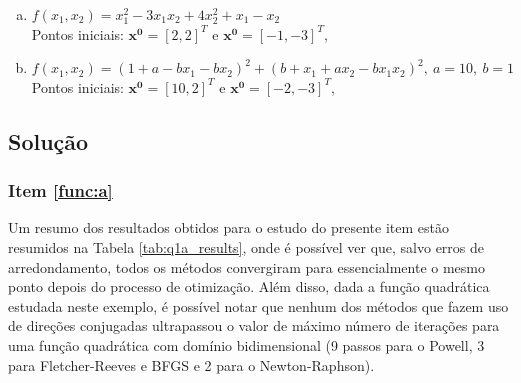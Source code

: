\documentclass[10pt, a4paper]{article}
\begin{document}
\begin{enumerate}[(a)]
  \item $f(x_1, x_2) = x_1^2 - 3x_1x_2 + 4x_2^2 + x_1 - x_2$ \\
        Pontos iniciais: $\mathbf{x^0} = [2, 2]^T$ e $\mathbf{x^0} = [-1, -3]^T$, \label{func:a}
  \item $f(x_1, x_2) = (1 + a - bx_1 - bx_2)^2 + (b + x_1 + ax_2 - bx_1x_2)^2, \ a = 10, \ b = 1$ \\
        Pontos iniciais: $\mathbf{x^0} = [10, 2]^T$ e $\mathbf{x^0} = [-2, -3]^T$, \label{func:b}
\end{enumerate}

\subsection{Solução}

\subsubsection{Item \ref{func:a}}

Um resumo dos resultados obtidos para o estudo do presente item estão resumidos na Tabela \ref{tab:q1a_results}, onde é
possível ver que, salvo erros de arredondamento, todos os métodos convergiram para essencialmente o mesmo ponto
depois do processo de otimização. Além disso, dada a função quadrática estudada neste exemplo, é possível notar que nenhum
dos métodos que fazem uso de direções conjugadas ultrapassou o valor de máximo número de iterações para uma função
quadrática com domínio bidimensional (9 passos para o Powell, 3 para Fletcher-Reeves e BFGS e 2 para o Newton-Raphson).
\end{document}
